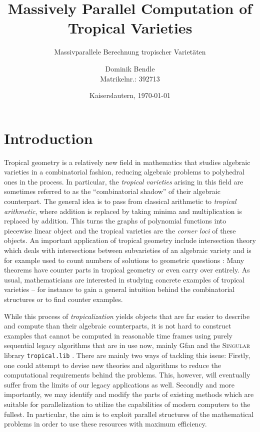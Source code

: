 \documentclass[
  paper=a4,
  titlepage,
  bibliography=totoc,
  pagesize=pdftex
]{scrartcl}
\title{Massively Parallel Computation of Tropical Varieties}
\subtitle{Massivparallele Berechnung tropischer Varietäten}
\author{Dominik Bendle\\{\small Matrikelnr.: 392713}}
\date{Kaiserslautern, \today}
\numberwithin{figure}{section}
\numberwithin{equation}{section}
\numberwithin{table}{section}
\theoremstyle{definition}
\numberwithin{definition}{section}
\begin{document}
\pagestyle{plain}

\maketitle

\tableofcontents
\newpage
\listoffigures
\listoftables
\lstlistoflistings
\newpage

\pagestyle{headings}

\section{Introduction}

Tropical geometry is a relatively new field in mathematics that studies algebraic
varieties in a combinatorial fashion, reducing algebraic problems to polyhedral ones in
the process. In particular, the \emph{tropical varieties} arising in this field are
sometimes referred to as the \enquote{combinatorial shadow} of their algebraic
counterpart. The general idea is to pass from classical arithmetic to \emph{tropical
arithmetic}, where addition is replaced by taking minima and multiplication is replaced by
addition. This turns the graphs of polynomial functions into piecewise linear object and
the tropical varieties are the \emph{corner loci} of these objects. An important
application of tropical geometry include intersection theory which deals with
intersections between subvarieties of an algebraic variety and is for example used to
count numbers of solutions to geometric questions \cite{mikhEnum}: Many theorems have
counter parts in tropical geometry or even carry over entirely.
As usual, mathematicians are interested in studying concrete examples of tropical
varieties -- for instance to gain a general intuition behind the combinatorial structures
or to find counter examples.

While this process of \emph{tropicalization} yields objects that are far easier to
describe and compute than their algebraic counterparts, it is not hard to construct
examples that cannot be computed in reasonable time frames using purely sequential legacy
algorithms that are in use now, mainly Gfan \cite{gfan} and the \textsc{Singular} library
\texttt{tropical.lib} \cite{tropLib}. There are mainly two ways of tackling this issue:
Firstly, one could attempt to devise new theories and algorithms to reduce the
computational requirements behind the problems. This, however, will eventually suffer from
the limits of our legacy applications as well. Secondly and more importantly, we may
identify and modify the parts of existing methods which are suitable for parallelization
to utilize the capabilities of modern computers to the fullest. In particular, the aim is
to exploit parallel structures of the mathematical problems in order to use these
resources with maximum efficiency.
\end{document}

